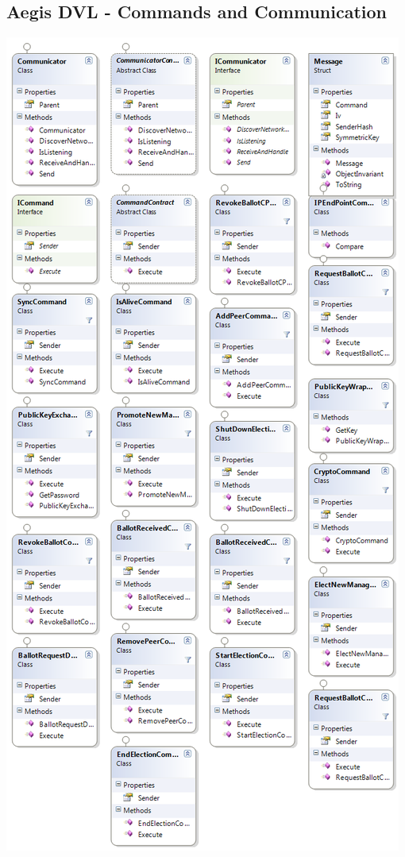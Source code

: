 \documentclass[a4paper]{report}
\begin{document}
\subsection*{ Aegis DVL - Commands and Communication}
\begin{center}
\includegraphics[width=\textwidth, height=\textheight - 10mm]{DVLClassdiagram_Commands.png}
\end{center}
\end{document}
